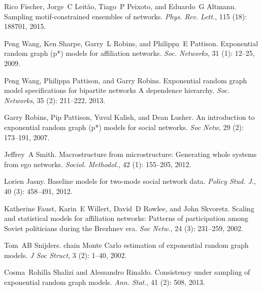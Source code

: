 Rico Fischer, Jorge~C Leit{\~a}o, Tiago~P Peixoto, and Eduardo~G Altmann.
\newblock Sampling motif-constrained ensembles of networks.
\newblock \emph{Phys. Rev. Lett.}, 115 (18): 188701, 2015.

Peng Wang, Ken Sharpe, Garry~L Robins, and Philippa~E Pattison.
\newblock Exponential random graph (p*) models for affiliation networks.
\newblock \emph{Soc. Networks}, 31 (1): 12--25, 2009.

Peng Wang, Philippa Pattison, and Garry Robins.
\newblock Exponential random graph model specifications for bipartite
networks A dependence hierarchy.
\newblock \emph{Soc. Networks}, 35 (2): 211--222,
2013{}.

Garry Robins, Pip Pattison, Yuval Kalish, and Dean Lusher.
\newblock An introduction to exponential random graph (p*) models for social
networks.
\newblock \emph{Soc Netw}, 29 (2): 173--191, 2007.

Jeffrey~A Smith.
\newblock Macrostructure from microstructure: {{Generating}} whole systems from
ego networks.
\newblock \emph{Sociol. Methodol.}, 42 (1): 155--205, 2012.

Lorien Jasny.
\newblock Baseline models for two-mode social network data.
\newblock \emph{Policy Stud. J.}, 40 (3): 458--491, 2012.

Katherine Faust, Karin~E Willert, David~D Rowlee, and John Skvoretz.
\newblock Scaling and statistical models for affiliation networks: Patterns of
participation among {{Soviet}} politicians during the {{Brezhnev}} era.
\newblock \emph{Soc Netw.}, 24 (3): 231--259, 2002.

Tom~AB Snijders.
 chain {{Monte Carlo}} estimation of exponential random graph
models.
\newblock \emph{J Soc Struct}, 3 (2): 1--40, 2002.

Cosma~Rohilla Shalizi and Alessandro Rinaldo.
\newblock Consistency under sampling of exponential random graph models.
\newblock \emph{Ann. Stat.}, 41 (2): 508, 2013.

